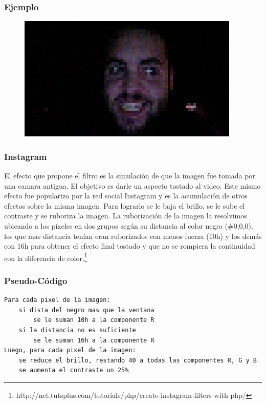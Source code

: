\subsubsection*{Ejemplo}
\begin{center}
  \begin{figure}[H]
  \includegraphics[scale=0.60]{imgs/pix.png}
  \end{figure}  
\end{center}

\subsubsection{Instagram}

El efecto que propone el filtro es la simulaci\'on de que la imagen fue tomada por una camara antigua. El objetivo es darle un aspecto tostado al video. Este mismo efecto fue popularizo por la red social Instagram y es la acumulaci\'on de otros efectos sobre la misma imagen. Para lograrlo se le baja el brillo, se le sube el contraste y se ruboriza la imagen. La ruborizaci\'on de la imagen la resolvimos ubicando a los p\'ixeles en dos grupos seg\'un su distancia al color negro (\#0,0,0), los que mas distancia ten\'ian eran ruborizados con menos fuerza (10h) y los dem\'as con 16h para obtener el efecto final tostado y que no se rompiera la continuidad con la diferencia de color.\footnote{http://net.tutsplus.com/tutorials/php/create-instagram-filters-with-php/}

\subsubsection*{Pseudo-C\'odigo}
\begin{verbatim}
Para cada pixel de la imagen:
    si dista del negro mas que la ventana
        se le suman 10h a la componente R
    si la distancia no es suficiente
        se le suman 16h a la componente R
Luego, para cada pixel de la imagen:
    se reduce el brillo, restando 40 a todas las componentes R, G y B
    se aumenta el contraste un 25%
\end{verbatim}

